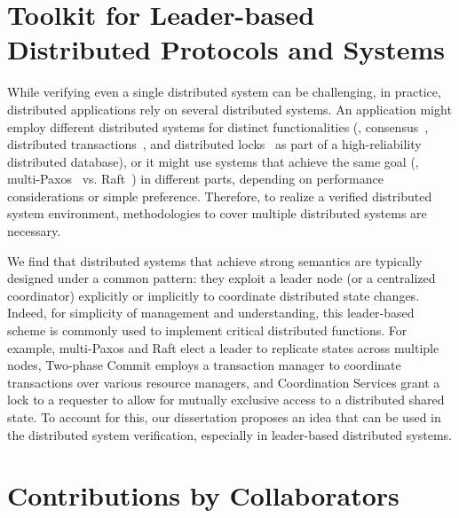 \section{Toolkit for Leader-based Distributed Protocols and Systems}
\label{chapter:introduction:sec:toolkit-for-leader-based-distributed-protocols-and-systems}


While verifying even a single distributed system can be challenging, in practice, distributed applications rely on several distributed systems. 
An application might employ different distributed systems for distinct functionalities (\eg, consensus~\cite{vivaladifference}, 
distributed transactions~\cite{gray:2006}, and distributed locks~\cite{chubby, zookeeper}  as part of a high-reliability distributed database), 
or it might use systems that achieve the same goal (\eg, multi-Paxos~\cite{paxosmadesimple, rvrpaxos} vs. Raft~\cite{raft}) in different parts, 
depending on performance considerations or simple preference. 
Therefore, to realize a verified distributed system environment, methodologies to cover multiple distributed systems are necessary. 


We find that distributed systems that achieve strong semantics are typically designed under a common pattern: 
they exploit a leader node (or a centralized coordinator) explicitly or implicitly to coordinate distributed state changes. 
Indeed, for simplicity of management and understanding, this leader-based scheme is commonly used to implement critical distributed functions. 
For example, multi-Paxos and Raft elect a leader to replicate states across multiple nodes, 
Two-phase Commit employs a transaction manager to coordinate transactions over various resource managers, 
and Coordination Services grant a lock to a requester to allow for mutually exclusive access to a distributed shared state. 
To account for this, our dissertation proposes an idea that can be used in the distributed system verification, especially in leader-based distributed systems. 

\section{Contributions by Collaborators}
\label{chapter:introduction:sec:contributions-by-collaborators}

